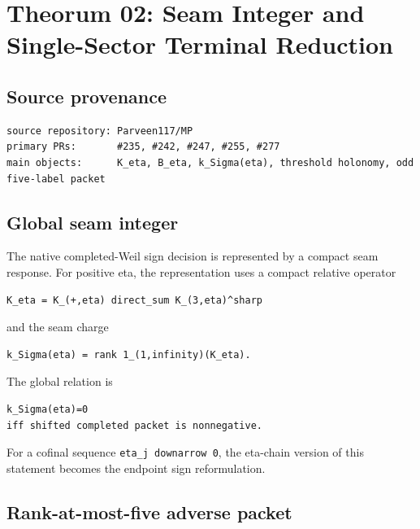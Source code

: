 \hypertarget{theorum-02-seam-integer-and-single-sector-terminal-reduction}{%
\chapter{Theorum 02: Seam Integer and Single-Sector Terminal Reduction}\label{theorum-02-seam-integer-and-single-sector-terminal-reduction}}

\hypertarget{source-provenance}{%
\section{Source provenance}\label{source-provenance}}

\begin{verbatim}
source repository: Parveen117/MP
primary PRs:       #235, #242, #247, #255, #277
main objects:      K_eta, B_eta, k_Sigma(eta), threshold holonomy, odd five-label packet
\end{verbatim}

\hypertarget{global-seam-integer}{%
\section{Global seam integer}\label{global-seam-integer}}

The native completed-Weil sign decision is represented by a compact seam response. For positive eta, the representation uses a compact relative operator

\begin{verbatim}
K_eta = K_(+,eta) direct_sum K_(3,eta)^sharp
\end{verbatim}

and the seam charge

\begin{verbatim}
k_Sigma(eta) = rank 1_(1,infinity)(K_eta).
\end{verbatim}

The global relation is

\begin{verbatim}
k_Sigma(eta)=0
iff shifted completed packet is nonnegative.
\end{verbatim}

For a cofinal sequence \texttt{eta\_j\ downarrow\ 0}, the eta-chain version of this statement becomes the endpoint sign reformulation.

\hypertarget{rank-at-most-five-adverse-packet}{%
\section{Rank-at-most-five adverse packet}\label{rank-at-most-five-adverse-packet}}

